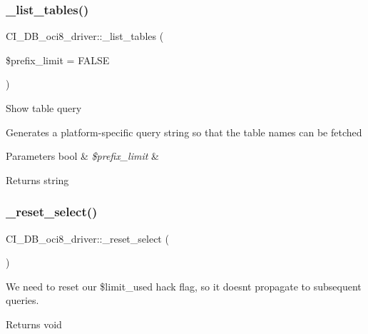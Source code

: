 \subsubsection{\texorpdfstring{\+\_\+list\+\_\+tables()}{\_list\_tables()}}
{\footnotesize\ttfamily C\+I\+\_\+\+D\+B\+\_\+oci8\+\_\+driver\+::\+\_\+list\+\_\+tables (\begin{DoxyParamCaption}\item[{}]{\$prefix\+\_\+limit = {\ttfamily FALSE} }\end{DoxyParamCaption})\hspace{0.3cm}{\ttfamily [protected]}}

Show table query

Generates a platform-\/specific query string so that the table names can be fetched


\begin{DoxyParams}[1]{Parameters}
bool & {\em \$prefix\+\_\+limit} & \\
\hline
\end{DoxyParams}
\begin{DoxyReturn}{Returns}
string 
\end{DoxyReturn}
\mbox{\label{class_c_i___d_b__oci8__driver_a242b3f0766b9d4ad759c14c7cd43e72a}} 
\subsubsection{\texorpdfstring{\+\_\+reset\+\_\+select()}{\_reset\_select()}}
{\footnotesize\ttfamily C\+I\+\_\+\+D\+B\+\_\+oci8\+\_\+driver\+::\+\_\+reset\+\_\+select (\begin{DoxyParamCaption}{ }\end{DoxyParamCaption})\hspace{0.3cm}{\ttfamily [protected]}}

We need to reset our \$limit\+\_\+used hack flag, so it doesn\textquotesingle{}t propagate to subsequent queries.

\begin{DoxyReturn}{Returns}
void 
\end{DoxyReturn}
\mbox{\label{class_c_i___d_b__oci8__driver_addfcc8f1875daf14816362e22c98704c}} 
